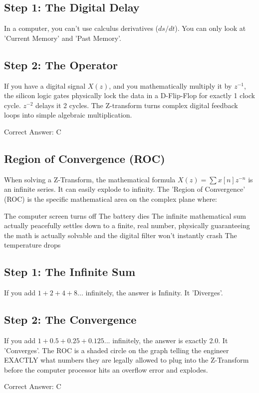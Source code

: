 \begin{solution}

\subsection*{Step 1: The Digital Delay}
In a computer, you can't use calculus derivatives ($ds/dt$). You can only look at 'Current Memory' and 'Past Memory'.

\subsection*{Step 2: The Operator}
If you have a digital signal $X(z)$, and you mathematically multiply it by $z^{-1}$, the silicon logic gates physically lock the data in a D-Flip-Flop for exactly 1 clock cycle. $z^{-2}$ delays it 2 cycles. The Z-transform turns complex digital feedback loops into simple algebraic multiplication.

Correct Answer: C
\end{solution}

\clearpage

\subsection{Region of Convergence (ROC)}

When solving a Z-Transform, the mathematical formula $X(z) = \sum x[n] z^{-n}$ is an infinite series. It can easily explode to infinity. The 'Region of Convergence' (ROC) is the specific mathematical area on the complex plane where:

\begin{choices}
    \choice The computer screen turns off
    \choice The battery dies
    \correctchoice The infinite mathematical sum actually peacefully settles down to a finite, real number, physically guaranteeing the math is actually solvable and the digital filter won't instantly crash
    \choice The temperature drops
\end{choices}

\begin{solution}

\subsection*{Step 1: The Infinite Sum}
If you add $1 + 2 + 4 + 8...$ infinitely, the answer is Infinity. It 'Diverges'.

\subsection*{Step 2: The Convergence}
If you add $1 + 0.5 + 0.25 + 0.125...$ infinitely, the answer is exactly 2.0. It 'Converges'. The ROC is a shaded circle on the graph telling the engineer EXACTLY what numbers they are legally allowed to plug into the Z-Transform before the computer processor hits an overflow error and explodes.

Correct Answer: C
\end{solution}

